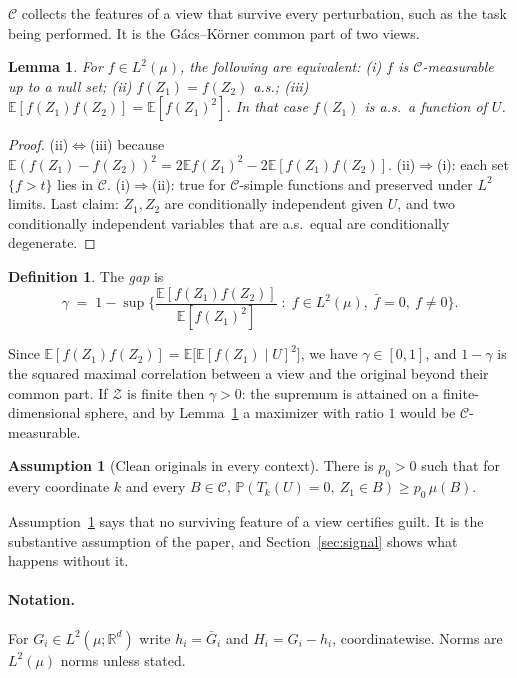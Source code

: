 \documentclass[11pt]{article}
\newtheorem{lemma}{Lemma}
\theoremstyle{definition}
\newtheorem{assumption}{Assumption}
\newtheorem{definition}{Definition}
\theoremstyle{remark}
\newcommand{\E}{\mathbb{E}}
\renewcommand{\P}{\mathbb{P}}
\newcommand{\R}{\mathbb{R}}
\newcommand{\cC}{\mathcal{C}}
\newcommand{\cZ}{\mathcal{Z}}
\begin{document}
$\cC$ collects the features of a view that survive every perturbation, such as the task being performed. It is the Gács--Körner common part of two views.

\begin{lemma}\label{l:common}
For $f\in L^2(\mu)$, the following are equivalent: (i) $f$ is $\cC$-measurable up to a null set; (ii) $f(Z_1)=f(Z_2)$ a.s.; (iii) $\E[f(Z_1)f(Z_2)]=\E[f(Z_1)^2]$. In that case $f(Z_1)$ is a.s.\ a function of $U$.
\end{lemma}
\begin{proof}
(ii)$\Leftrightarrow$(iii) because $\E(f(Z_1)-f(Z_2))^2=2\E f(Z_1)^2-2\E[f(Z_1)f(Z_2)]$. (ii)$\Rightarrow$(i): each set $\{f>t\}$ lies in $\cC$. (i)$\Rightarrow$(ii): true for $\cC$-simple functions and preserved under $L^2$ limits. Last claim: $Z_1,Z_2$ are conditionally independent given $U$, and two conditionally independent variables that are a.s.\ equal are conditionally degenerate.
\end{proof}

\begin{definition}\label{d:gap}
The \emph{gap} is
\[
\gamma\;=\;1-\sup\Big\{\frac{\E[f(Z_1)f(Z_2)]}{\E[f(Z_1)^2]}\;:\;f\in L^2(\mu),\ \bar f=0,\ f\neq 0\Big\}.
\]
\end{definition}

Since $\E[f(Z_1)f(Z_2)]=\E\big[\E[f(Z_1)\mid U]^2\big]$, we have $\gamma\in[0,1]$, and $1-\gamma$ is the squared maximal correlation between a view and the original beyond their common part. If $\cZ$ is finite then $\gamma>0$: the supremum is attained on a finite-dimensional sphere, and by Lemma~\ref{l:common} a maximizer with ratio $1$ would be $\cC$-measurable.

\begin{assumption}[Clean originals in every context]\label{a:clean}
There is $p_0>0$ such that for every coordinate $k$ and every $B\in\cC$, $\P(T_k(U)=0,\ Z_1\in B)\ge p_0\,\mu(B)$.
\end{assumption}

Assumption~\ref{a:clean} says that no surviving feature of a view certifies guilt. It is the substantive assumption of the paper, and Section~\ref{sec:signal} shows what happens without it.

\paragraph{Notation.} For $G_i\in L^2(\mu;\R^d)$ write $h_i=\bar G_i$ and $H_i=G_i-h_i$, coordinatewise. Norms are $L^2(\mu)$ norms unless stated.
\end{document}
